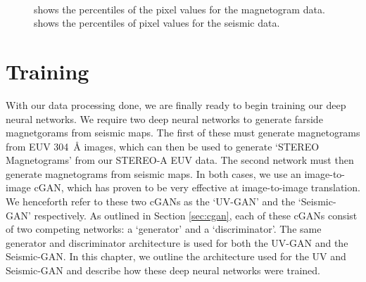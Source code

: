 \documentclass[11pt,a4paper,onecolumn]{report}
\begin{document}
\begin{figure}[t]%
  \\
  \caption[]{ shows the percentiles of the pixel values for
  the magnetogram data.  shows the percentiles of pixel
  values for the seismic data.}
  \label{fig:hmi_seismic_p}
\end{figure}


%
%
%
%
%
%
%
%
\chapter{Training}
\label{chap:training}
%
%
%
%
%
%
%
%
With our data processing done, we are finally ready to begin training our deep
neural networks.
We require two deep neural networks to generate farside magnetgorams from
seismic maps. The first of these must generate magnetograms from EUV
\SI{304}{\angstrom} images, which can then be used to generate `STEREO
Magnetograms' from our STEREO-A EUV data. The second network must then generate
magnetograms from seismic maps. In both cases, we use an image-to-image cGAN,
which has proven to be very effective at image-to-image translation. We
henceforth refer to these two cGANs as the `UV-GAN' and the `Seismic-GAN'
respectively. As outlined in Section \ref{sec:cgan}, each of these cGANs consist
of two competing networks: a `generator' and a `discriminator'. The same
generator and discriminator architecture is used for both the UV-GAN and the
Seismic-GAN. In this chapter, we outline the architecture used for the UV and
Seismic-GAN and describe how these deep neural networks were trained.
\end{document}
